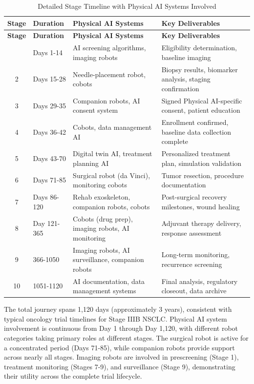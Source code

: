 \begin{longtable}{c p{2.25cm} p{6cm} p{6cm}}
\caption{Detailed Stage Timeline with Physical AI Systems Involved}
\label{tab:journey-timeline} \\
\toprule
\textbf{Stage} & \textbf{Duration} & \textbf{Physical AI Systems} & \textbf{Key Deliverables} \\
\midrule
\endfirsthead
\toprule
\textbf{Stage} & \textbf{Duration} & \textbf{Physical AI Systems} & \textbf{Key Deliverables} \\
\midrule
\endhead
\bottomrule
\endfoot
1 & Days 1-14 & AI screening algorithms, imaging robots & Eligibility determination, baseline imaging \\
2 & Days 15-28 & Needle-placement robot, cobots & Biopsy results, biomarker analysis, staging confirmation \\
3 & Days 29-35 & Companion robots, AI consent system & Signed Physical AI-specific consent, patient education \\
4 & Days 36-42 & Cobots, data management AI & Enrollment confirmed, baseline data collection complete \\
5 & Days 43-70 & Digital twin AI, treatment planning AI & Personalized treatment plan, simulation validation \\
6 & Days 71-85 & Surgical robot (da Vinci), monitoring cobots & Tumor resection, procedure documentation \\
7 & Days 86-120 & Rehab exoskeleton, companion robots, cobots & Post-surgical recovery milestones, wound healing \\
8 & Day 121-365 & Cobots (drug prep), imaging robots, AI monitoring & Adjuvant therapy delivery, response assessment \\
9 & 366-1050 & Imaging robots, AI surveillance, companion robots & Long-term monitoring, recurrence screening \\
10 & 1051-1120 & AI documentation, data management systems & Final analysis, regulatory closeout, data archive \\
\end{longtable}

The total journey spans 1,120 days (approximately 3 years), consistent with
typical oncology trial timelines for Stage IIIB NSCLC. Physical AI system
involvement is continuous from Day 1 through Day 1,120, with different robot
categories taking primary roles at different stages. The surgical robot is
active for a concentrated period (Days 71-85), while companion robots provide
support across nearly all stages. Imaging robots are involved in prescreening
(Stage 1), treatment monitoring (Stages 7-9), and surveillance (Stage 9),
demonstrating their utility across the complete trial lifecycle.

